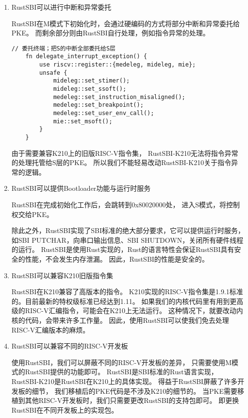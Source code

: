 \begin{enumerate}
    \item RustSBI可以进行中断和异常委托
    
    RustSBI在M模式下初始化时，会通过硬编码的方式将部分中断和异常委托给PKE。
    而剩余部分则由RustSBI自行处理，例如指令异常的处理。

    \begin{lstlisting}[caption={RustSBI的中断和异常委托}, label={lst:rustsbi_interrupt_and_exception}]
    // 委托终端；把S的中断全部委托给S层
    fn delegate_interrupt_exception() {
        use riscv::register::{medeleg, mideleg, mie};
        unsafe {
            mideleg::set_stimer();
            mideleg::set_ssoft();
            medeleg::set_instruction_misaligned();
            medeleg::set_breakpoint();
            medeleg::set_user_env_call();
            mie::set_msoft();
        }
    }
    \end{lstlisting}

    由于需要兼容K210上的旧版RISC-V指令集，
    RustSBI-K210无法将指令异常的处理托管给S层的PKE。
    所以我们不能轻易改动RustSBI-K210关于指令异常的逻辑。

    \item RustSBI可以提供Bootloader功能与运行时服务
    
    RustSBI在完成初始化工作后，会跳转到0x80020000处，
    进入S模式，将控制权交给PKE。

    除此之外，RustSBI实现了SBI标准的绝大部分要求，它可以提供运行时服务，
    如SBI PUTCHAR，向串口输出信息、SBI SHUTDOWN，关闭所有硬件线程的运行。
    RustSBI是使用Rust实现的，Rust的语言特性会保证RustSBI具有安全的性能，不会发生内存泄漏。
    因此，RustSBI的性能是安全的\cite{FSK2014The}。

    \item RustSBI可以兼容K210旧版指令集

    RustSBI在K210兼容了高版本的指令。
    K210实现的RISC-V指令集是1.9.1标准的。目前最新的特权级标准已经达到1.11。
    如果我们的内核代码里有用到更高级的RISC-V汇编指令，可能会在K210上无法运行。
    这种情况下，就要改动内核的代码，会带来许多工作量。
    因此，使用RustSBI可以使我们免去处理RISC-V汇编版本的麻烦。

    \item RustSBI可以兼容不同的RISC-V开发板
    
    使用RustSBI，我们可以屏蔽不同的RISC-V开发板的差异，
    只需要使用M模式的RustSBI提供的功能即可。
    RustSBI是SBI标准的Rust语言实现，
    RustSBI-K210是RustSBI在K210上的具体实现。
    得益于RustSBI屏蔽了许多开发板的细节，
    我们移植后的PKE代码是不涉及K210的细节的。
    当PKE需要移植到其他RISC-V开发板时，我们只需要更改RustSBI的支持包即可。
    即更换RustSBI在不同开发板上的实现包。

\end{enumerate}


